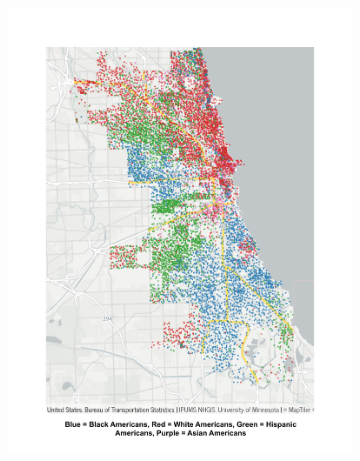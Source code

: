 \documentclass[12pt]{article}
\begin{document}
\begin{figure}[h!]
\centering
    \caption{Population by Race and Income}
    \begin{subfigure}{0.52\textwidth}
         \centering
         \includegraphics[width=\textwidth]{Pset1/Figures/Descriptive/racial_map.pdf}
         \label{fig:racial_divide}
    \end{subfigure}  
    \begin{subfigure}{0.45\textwidth}
         \centering

\end{subfigure}
\end{figure}
\end{document}
